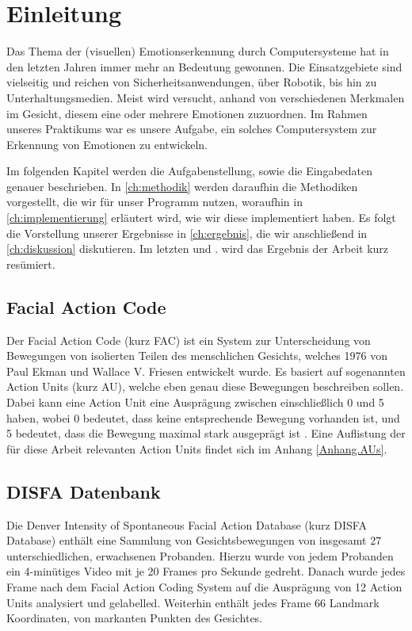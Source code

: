 \chapter{Einleitung}
\label{ch:einleitung}

Das Thema der (visuellen) Emotionserkennung durch Computersysteme hat in den letzten Jahren immer mehr an Bedeutung gewonnen.
Die Einsatzgebiete sind vielseitig und reichen von Sicherheitsanwendungen, über Robotik, bis hin zu Unterhaltungsmedien.
Meist wird versucht, anhand von verschiedenen Merkmalen im Gesicht, diesem eine oder mehrere Emotionen zuzuordnen. Im Rahmen
unseres Praktikums war es unsere Aufgabe, ein solches Computersystem zur Erkennung von Emotionen zu entwickeln.

Im folgenden Kapitel werden die Aufgabenstellung, sowie die Eingabedaten genauer beschrieben.
In \cref{ch:methodik} werden daraufhin die Methodiken vorgestellt, die wir für unser Programm nutzen, woraufhin in \cref{ch:implementierung} erläutert wird,
wie wir diese implementiert haben. Es folgt die Vorstellung unserer
Ergebnisse in \cref{ch:ergebnis}, die wir anschließend in \cref{ch:diskussion}
diskutieren. Im letzten und .  wird das Ergebnis der Arbeit kurz resümiert.

\section{Facial Action Code}
Der Facial Action Code (kurz FAC) ist ein System zur Unterscheidung von Bewegungen von isolierten Teilen des menschlichen Gesichts, welches
1976 von Paul Ekman und Wallace V. Friesen entwickelt wurde. Es basiert auf sogenannten Action Units (kurz AU), welche eben genau diese Bewegungen
beschreiben sollen. Dabei kann eine Action Unit eine Ausprägung zwischen einschließlich 0 und 5 haben, wobei 0 bedeutet, dass keine entsprechende
Bewegung vorhanden ist, und 5 bedeutet, dass die Bewegung maximal stark ausgeprägt ist \cite{ekman}. Eine Auflistung der für diese Arbeit relevanten Action Units
findet sich im Anhang \ref{Anhang.AUs}.

\section{DISFA Datenbank}
Die Denver Intensity of Spontaneous Facial Action Database (kurz DISFA Database) enthält eine Sammlung von Gesichtsbewegungen von insgesamt
27 unterschiedlichen, erwachsenen Probanden. Hierzu wurde von jedem Probanden ein 4-minütiges Video mit je 20 Frames pro Sekunde gedreht.
Danach wurde jedes Frame nach dem Facial Action Coding System auf die Ausprägung von 12 Action Units analysiert und gelabelled.\newline
Weiterhin enthält jedes Frame 66 Landmark Koordinaten, von markanten Punkten des Gesichtes.

